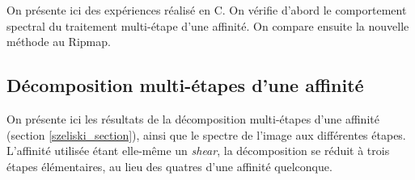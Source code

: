On présente ici des expériences réalisé en C. On vérifie d'abord le comportement spectral du traitement multi-étape d'une affinité. On compare ensuite la nouvelle méthode au Ripmap.

\subsection{Décomposition multi-étapes d'une affinité}
 
 On présente ici les résultats de la décomposition multi-étapes d'une affinité \cite{szeliski2010high} (section \ref{szeliski_section}), ainsi que le spectre de l'image aux différentes étapes. L'affinité utilisée étant elle-même un \emph{shear}, la décomposition se réduit à trois étapes élémentaires, au lieu des quatres d'une affinité quelconque.
 

